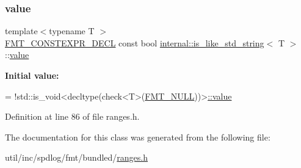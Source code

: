 \subsubsection{\texorpdfstring{value}{value}}
{\footnotesize\ttfamily template$<$typename T $>$ \\
\hyperlink{core_8h_af4388801466a5994a363d6005616371a}{F\+M\+T\+\_\+\+C\+O\+N\+S\+T\+E\+X\+P\+R\+\_\+\+D\+E\+CL} const bool \hyperlink{classinternal_1_1is__like__std__string}{internal\+::is\+\_\+like\+\_\+std\+\_\+string}$<$ T $>$\+::\hyperlink{classinternal_1_1value}{value}\hspace{0.3cm}{\ttfamily [static]}}

{\bfseries Initial value\+:}
\begin{DoxyCode}
=
    !std::is\_void<decltype(check<T>(\hyperlink{core_8h_af7f827e50dd7667484c279ac1d38f30b}{FMT\_NULL}))>\hyperlink{classinternal_1_1is__like__std__string_a669d29cac2e005cbe132b885f482cdbf}{::value}
\end{DoxyCode}


Definition at line 86 of file ranges.\+h.



The documentation for this class was generated from the following file\+:\begin{DoxyCompactItemize}
\item 
util/inc/spdlog/fmt/bundled/\hyperlink{ranges_8h}{ranges.\+h}\end{DoxyCompactItemize}
